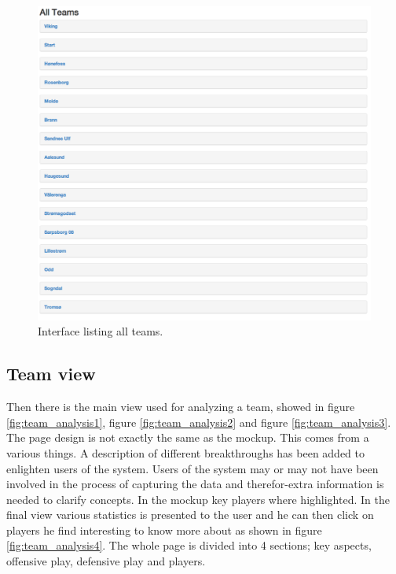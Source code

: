 \begin{figure}[H]
\centering
\includegraphics[width=1\textwidth]{images/general/all_teams.png}
\caption{Interface listing all teams.}
\label{fig:all_teams}
\end{figure}

\subsection{Team view}

Then there is the main view used for analyzing a team, showed in figure \ref{fig:team_analysis1}, figure \ref{fig:team_analysis2} and figure \ref{fig:team_analysis3}. The page design is not exactly the same as the mockup. This comes from a various things. A description of different breakthroughs has been added to enlighten users of the system. Users of the system may or may not have been involved in the process of capturing the data and therefor-extra information is needed to clarify concepts. In the mockup key players where highlighted. In the final view various statistics is presented to the user and he can then click on players he find interesting to know more about as shown in figure \ref{fig:team_analysis4}. The whole page is divided into 4 sections; key aspects, offensive play, defensive play and players.

